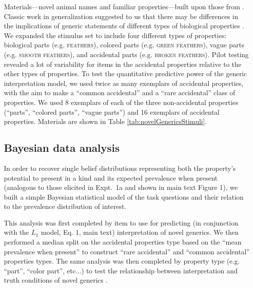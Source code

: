 \documentclass[10pt,letterpaper]{article}
\begin{document}
Materials---novel animal names and familiar properties---built upon those from . 
Classic work in generalization suggested to us that there may be differences in the implications of generic statements of different types of biological properties \cite{Nisbett1983}. 
We expanded the stimulus set to include four different types of properties: biological parts (e.g. \textsc{feathers}), colored parts (e.g. \textsc{green feathers}), vague parts (e.g. \textsc{smooth feathers}), and accidental parts (e.g. \textsc{broken feathers}). 
Pilot testing revealed a lot of variability for items in the accidental properties relative to the other types of properties. 
To test the quantitative predictive power of the generic interpretation model, we used twice as many exemplars of accidental properties, with the aim to make a ``common accidental'' and a ``rare accidental'' class of properties. 
We used 8 exemplars of each of the three non-accidental properties (``parts'', ``colored parts'', ``vague parts'') and 16 exemplars of accidental properties.
Materials are shown in Table \ref{tab:novelGenericsStimuli}.

\subsection{Bayesian data analysis}
\label{sec:bda2}

In order to recover single belief distributions representing both the property's potential to present in a kind and its expected prevalence when present (analogous to those elicited in Expt.~1a and shown in main text Figure 1), we built a simple Bayesian statistical model of the task questions and their relation to the prevalence distribution of interest. 

This analysis was first completed by item to use for predicting (in conjunction with the $L_1$ model, Eq. 1, main text) interpretation of novel generics.
We then performed a median split on the accidental properties type based on the ``mean prevalence when present'' to construct ``rare accidental'' and ``common accidental'' properties types. 
The same analysis was then completed by property type (e.g. ``part'', ``color part'', etc...) to test the relationship between interpretation and truth conditions of novel generics \cite{Cimpian2010}.
\end{document}

